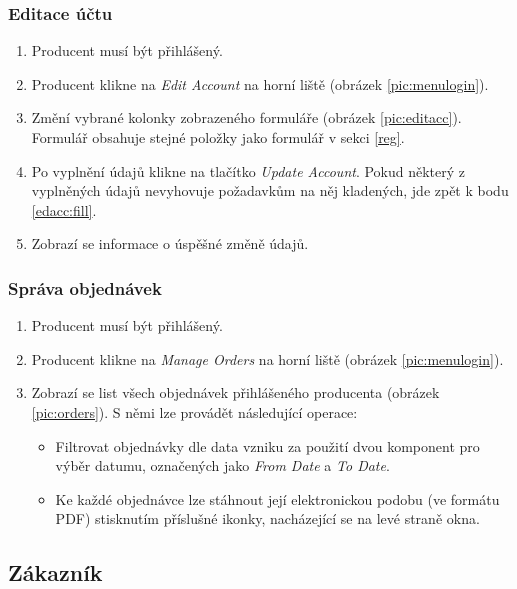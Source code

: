 \documentclass[12pt]{article}
\begin{document}
\subsubsection{Editace účtu}
\begin{enumerate}
\item Producent musí být přihlášený.
\item Producent klikne na \emph{Edit Account} na horní liště (obrázek \ref{pic:menulogin}).
\item \label{edacc:fill} Změní vybrané kolonky zobrazeného formuláře (obrázek \ref{pic:editacc}). Formulář obsahuje stejné položky jako formulář v sekci \ref{reg}.
\item Po vyplnění údajů klikne na tlačítko \emph{Update Account}. Pokud některý z vyplněných údajů nevyhovuje požadavkům na něj kladených, jde zpět k bodu \ref{edacc:fill}.
\item Zobrazí se informace o úspěšné změně údajů.
\end{enumerate}

\subsubsection{Správa objednávek}
\begin{enumerate}
\item Producent musí být přihlášený.
\item Producent klikne na \emph{Manage Orders} na horní liště (obrázek \ref{pic:menulogin}).
\item Zobrazí se list všech objednávek přihlášeného producenta (obrázek \ref{pic:orders}). S němi lze provádět následující operace:

  \begin{itemize}
  \item Filtrovat objednávky dle data vzniku za použití dvou komponent pro výběr datumu, označených jako \emph{From Date} a \emph{To Date}.
  \item Ke každé objednávce lze stáhnout její elektronickou podobu (ve formátu PDF) stisknutím příslušné ikonky, nacházející se na levé straně okna.
  \end{itemize}

\end{enumerate}


\subsection{Zákazník}
\end{document}
